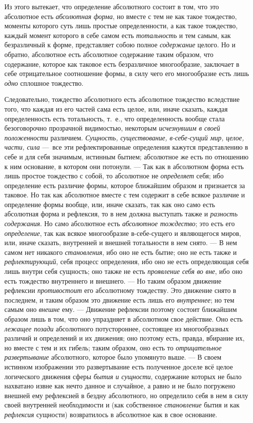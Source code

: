 Из этого вытекает, что определение абсолютного состоит в том, что это
абсолютное есть {\em абсолютная форма}, но вместе с тем
не как такое тождество, моменты которого суть лишь простые определенности,
а как такое тождество, каждый момент которого в себе самом есть
{\em тотальность} и тем самым, как безразличный к
форме, представляет собою полное {\em содержание}
целого. Но и обратно, абсолютное есть абсолютное содержание таким образом,
что содержание, которое как таковое есть безразличное многообразие,
заключает в себе отрицательное соотношение формы, в силу чего его
многообразие есть лишь {\em одно} сплошное тождество.

Следовательно, тождество абсолютного есть абсолютное тождество вследствие
того, что каждая из его частей сама есть целое, или, иначе сказать, каждая
определенность есть тотальность, т.~е., что определенность вообще стала
безоговорочно прозрачной видимостью, некоторым
{\em исчезнувшим в своей положенности} различием.
{\em Сущность, существование, в-себе-сущий мир, целое,
части, сила} —~все эти рефлектированные определения кажутся представлению в
себе и для себя значимым, истинным бытием; абсолютное же есть по отношению
к ним основание, в котором они потонули. — Так как в абсолютном форма есть
лишь простое тождество с собой, то абсолютное не
{\em определяет} себя; ибо определение есть различие
формы, которое ближайшим образом и признается за таковое. Но так как
абсолютное вместе с тем содержит в себе всякое различие и определение формы
вообще, или, иначе сказать, так как оно само есть абсолютная форма и
рефлексия, то в нем должна выступать также и
{\em разность содержания}. Но само абсолютное есть
{\em абсолютное тождество}; это есть его
{\em определение}, так как всякое многообразие
в-себе-сущего и являющегося миров, или, иначе сказать, внутренней и внешней
тотальности в нем снято. — В нем самом нет никакого
{\em становления}, ибо оно не есть бытие; оно не есть
также и {\em рефлектирующий}, себя процесс определения,
ибо оно не есть определяющая себя лишь внутри себя сущность; оно также не
есть {\em проявление себя во вне}, ибо оно есть
тождество внутреннего и внешнего. — Но таким образом движение рефлексии
{\em противостоит} его абсолютному тождеству. Это
движение снято в последнем, и таким образом это движение есть лишь его
{\em внутреннее}; но тем самым оно
{\em внешне} ему. — Движение рефлексии поэтому состоит
ближайшим образом лишь в том, что оно упраздняет в абсолютном свое
действие. Оно есть {\em лежащее позади} абсолютного
потустороннее, состоящее из многообразных различий и определений и их
движения; оно поэтому есть, правда, вбирание их, но вместе с тем и их
гибель; таким образом, оно есть то {\em отрицательное
развертывание} абсолютного, которое было упомянуто выше. — В своем истинном
изображении это развертывание есть полученное доселе всё целое логического
движения сферы {\em бытия и сущности}, содержание
которых не было нахватано извне как нечто данное и случайное, а равно и не
было погружено внешней ему рефлексией в бездну абсолютного, но определило
себя в нем в силу своей внутренней необходимости и (как собственное
{\em становление} бытия и как
{\em рефлексия} сущности) возвратилось в абсолютное как
в свое основание.

